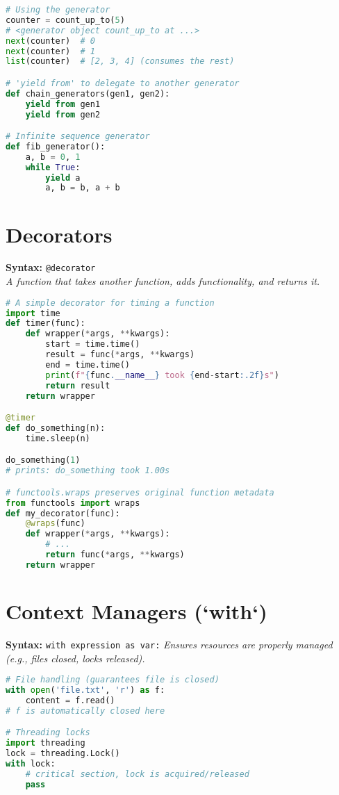 \documentclass[8pt,landscape]{article}
\begin{document}
\begin{multicols}{3}
\begin{lstlisting}[language=Python]
# Using the generator
counter = count_up_to(5)
# <generator object count_up_to at ...>
next(counter)  # 0
next(counter)  # 1
list(counter)  # [2, 3, 4] (consumes the rest)

# 'yield from' to delegate to another generator
def chain_generators(gen1, gen2):
    yield from gen1
    yield from gen2

# Infinite sequence generator
def fib_generator():
    a, b = 0, 1
    while True:
        yield a
        a, b = b, a + b
\end{lstlisting}

\section*{Decorators}
\textbf{Syntax:} \lstinline|@decorator| \\
\textit{A function that takes another function, adds functionality, and returns it.}
\begin{lstlisting}[language=Python]
# A simple decorator for timing a function
import time
def timer(func):
    def wrapper(*args, **kwargs):
        start = time.time()
        result = func(*args, **kwargs)
        end = time.time()
        print(f"{func.__name__} took {end-start:.2f}s")
        return result
    return wrapper

@timer
def do_something(n):
    time.sleep(n)

do_something(1)
# prints: do_something took 1.00s

# functools.wraps preserves original function metadata
from functools import wraps
def my_decorator(func):
    @wraps(func)
    def wrapper(*args, **kwargs):
        # ...
        return func(*args, **kwargs)
    return wrapper
\end{lstlisting}

\section*{Context Managers (`with`)}
\textbf{Syntax:} \lstinline|with expression as var:|
\textit{Ensures resources are properly managed (e.g., files closed, locks released).}
\begin{lstlisting}[language=Python]
# File handling (guarantees file is closed)
with open('file.txt', 'r') as f:
    content = f.read()
# f is automatically closed here

# Threading locks
import threading
lock = threading.Lock()
with lock:
    # critical section, lock is acquired/released
    pass


\end{lstlisting}
\end{multicols}
\end{document}
